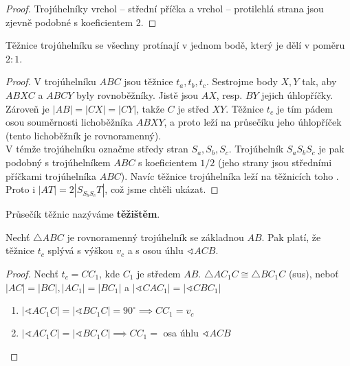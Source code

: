\begin{proof}
  Trojúhelníky vrchol -- střední příčka a vrchol -- protilehlá strana jsou zjevně podobné s koeficientem 2.
\end{proof}

\begin{veta}
  Těžnice trojúhelníku se všechny protínají v jednom bodě, který je dělí v poměru $2:1$.
\end{veta}

\begin{proof}
    V trojúhelníku $ABC$ jsou těžnice $t_a,t_b,t_c$. Sestrojme body $X,Y$ tak, aby
    $ABXC$ a $ABCY$ byly rovnoběžníky. Jistě jsou $AX$, resp. $BY$ jejich úhlopříčky.
    Zároveň je $|AB|=|CX|=|CY|$, takže $C$ je střed $XY$. Těžnice $t_c$ je tím pádem
    osou souměrnosti lichoběžníka $ABXY$, a proto leží na průsečíku jeho úhlopříček
    (tento lichoběžník je rovnoramenný).\\
    V témže trojúhelníku označme středy stran $S_a,S_b,S_c$. Trojúhelník $S_aS_bS_c$ je
    pak podobný s trojúhelníkem $ABC$ s koeficientem $1/2$ (jeho strany jsou středními
    příčkami trojúhelníka $ABC$). Navíc těžnice  trojúhelníka leží na
    těžnicích toho . Proto i $|AT|=2|S_{S_bS_c}T|$, což jsme chtěli ukázat.
\end{proof}

\begin{definition}
Průsečík těžnic nazýváme \textbf{těžištěm}.
\end{definition}

\begin{veta}
  Nechť $\triangle ABC$ je rovnoramenný trojúhelník se základnou $AB$. Pak platí, že těžnice $t_c$ splývá s výškou $v_c$ a s osou úhlu $\sphericalangle ACB$.
\end{veta}

\begin{proof}
  Nechť $t_c = CC_1$, kde $C_1$ je středem $AB$.
  $\triangle AC_1 C \cong \triangle BC_1 C$ (sus), neboť $|AC| = |BC|, |AC_1| = |BC_1|$ a $|\sphericalangle CAC_1| = |\sphericalangle CBC_1|$
  \begin{enumerate}[$i.$]
    \item $|\sphericalangle AC_1 C| = |\sphericalangle BC_1 C| = 90^\circ \implies CC_1 = v_c$
    \item $|\sphericalangle AC_1 C| = |\sphericalangle BC_1 C| \implies CC_1 = $ osa úhlu $\sphericalangle ACB$\qedhere
  \end{enumerate}
\end{proof}

